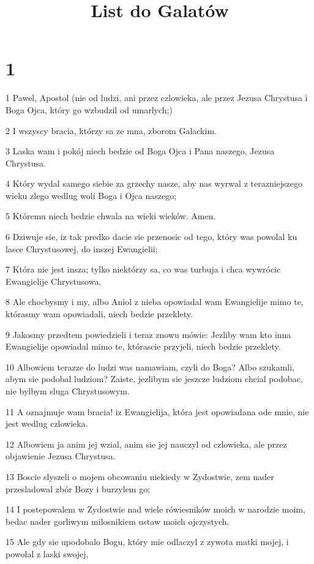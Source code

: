

\title{List do Galatów}


\chapter{1}

\par 1 Pawel, Apostol (nie od ludzi, ani przez czlowieka, ale przez Jezusa Chrystusa i Boga Ojca, który go wzbudzil od umarlych;)
\par 2 I wszyscy bracia, którzy sa ze mna, zborom Galackim.
\par 3 Laska wam i pokój niech bedzie od Boga Ojca i Pana naszego, Jezusa Chrystusa.
\par 4 Który wydal samego siebie za grzechy nasze, aby nas wyrwal z terazniejszego wieku zlego wedlug woli Boga i Ojca naszego;
\par 5 Któremu niech bedzie chwala na wieki wieków. Amen.
\par 6 Dziwuje sie, iz tak predko dacie sie przenosic od tego, który was powolal ku lasce Chrystusowej, do inszej Ewangielii;
\par 7 Która nie jest insza; tylko niektórzy sa, co was turbuja i chca wywrócic Ewangielije Chrystusowa.
\par 8 Ale chocbysmy i my, albo Aniol z nieba opowiadal wam Ewangielije mimo te, którasmy wam opowiadali, niech bedzie przeklety.
\par 9 Jakosmy przedtem powiedzieli i teraz znowu mówie: Jezliby wam kto inna Ewangielije opowiadal mimo te, którascie przyjeli, niech bedzie przeklety.
\par 10 Albowiem terazze do ludzi was namawiam, czyli do Boga? Albo szukamli, abym sie podobal ludziom? Zaiste, jezlibym sie jeszcze ludziom chcial podobac, nie bylbym sluga Chrystusowym.
\par 11 A oznajmuje wam bracia! iz Ewangielija, która jest opowiadana ode mnie, nie jest wedlug czlowieka.
\par 12 Albowiem ja anim jej wzial, anim sie jej nauczyl od czlowieka, ale przez objawienie Jezusa Chrystusa.
\par 13 Boscie slyszeli o mojem obcowaniu niekiedy w Zydostwie, zem nader przesladowal zbór Bozy i burzylem go;
\par 14 I postepowalem w Zydostwie nad wiele rówiesników moich w narodzie moim, bedac nader gorliwym milosnikiem ustaw moich ojczystych.
\par 15 Ale gdy sie upodobalo Bogu, który mie odlaczyl z zywota matki mojej, i powolal z laski swojej,
